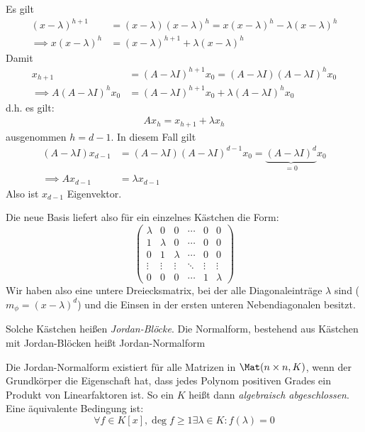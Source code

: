 \documentclass[a4paper, 10pt]{scrbook}
\begin{document}
Es gilt
\begin{align*}
	(x-\lambda)^{h+1} &=  (x-\lambda)(x-\lambda)^h = x(x-\lambda)^h -\lambda(x-\lambda)^h\\
	\implies x(x-\lambda)^h &= (x-\lambda)^{h+1} + \lambda(x-\lambda)^h
\end{align*}
Damit
\begin{align*}
	x_{h+1} &= (A-\lambda I)^{h+1} x_0 = (A-\lambda I)(A-\lambda I)^h x_0\\
	\implies A(A-\lambda I)^hx_0 &= (A-\lambda I)^{h+1}x_0 + \lambda (A-\lambda I)^h x_0
\end{align*}
d.h. es gilt:
\begin{align*}
	A x_h = x_{h+1} + \lambda x_h
\end{align*}
ausgenommen $h=d-1$.
In diesem Fall gilt
\begin{align*}
	(A-\lambda I)x_{d-1} &= (A-\lambda I)(A-\lambda I)^{d-1} x_0 = \underbrace{(A-\lambda I)^d}_{=0} x_0\\
	\implies Ax_{d-1} &= \lambda x_{d-1}
\end{align*}
Also ist $x_{d-1}$ Eigenvektor.

Die neue Basis liefert also für ein einzelnes Kästchen die Form:
\[
	\begin{pmatrix}
		\lambda & 0 & 0 & \cdots & 0 &0\\
		1 & \lambda & 0 & \cdots & 0 & 0\\
		0 & 1 & \lambda & \cdots & 0 &0\\
		\vdots & \vdots & \vdots & \ddots & \vdots &\vdots \\
		0 & 0 & 0 & \cdots & 1 & \lambda
	\end{pmatrix}
\]
Wir haben also eine untere Dreiecksmatrix, bei der alle Diagonaleinträge $\lambda$ sind ($m_\phi = (x-\lambda)^d$) und die Einsen in der ersten unteren Nebendiagonalen besitzt.

\begin{df}
	\label{df:12.19}
	Solche Kästchen heißen \emph{Jordan-Blöcke}.
	Die Normalform, bestehend aus Kästchen mit Jordan-Blöcken heißt Jordan-Normalform
\end{df}

Die Jordan-Normalform existiert für alle Matrizen in $\Mat(n\times n, K)$, wenn der Grundkörper die Eigenschaft hat, dass jedes Polynom positiven Grades ein Produkt von Linearfaktoren ist.
So ein $K$ heißt dann \emph{algebraisch abgeschlossen}.
Eine äquivalente Bedingung ist:
\[
	\forall f\in K[x], \deg f \ge 1  \exists \lambda \in K :f(\lambda) = 0
\]
\end{document}
